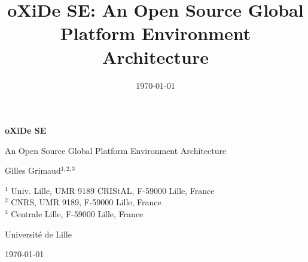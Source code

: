 \documentclass[a4paper,11pt,twoside,openright]{book}
\title{oXiDe SE: An Open Source Global Platform Environment Architecture}
\author{}
\date{\today}
\begin{document}
\begin{titlepage}
\centering

\vspace*{2cm}

{\Huge \textbf{oXiDe SE} \par}

\vspace{0.5cm}

{\Large An Open Source Global Platform Environment Architecture \par}

\vspace{1.5cm}

{\Large Gilles Grimaud$^{1,2,3}$ \par}

\vspace{0.5cm}

\small
$^{1}$ Univ. Lille, UMR 9189 CRIStAL, F-59000 Lille, France\\
$^{2}$ CNRS, UMR 9189, F-59000 Lille, France\\
$^{3}$ Centrale Lille, F-59000 Lille, France

\vspace{1cm}

{\large Université de Lille}

\vspace{1cm}

{\large \today}

\vfill

\end{titlepage}

\tableofcontents
\newpage










\appendix






\begingroup
\raggedright


\endgroup
\end{document}
